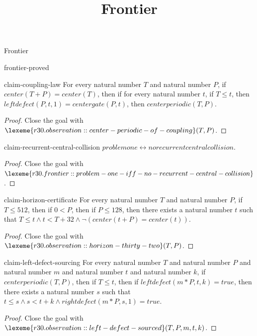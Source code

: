 \begin{lexlean}{Frontier}
\title{Frontier}

\begin{section}{frontier-proved}

\begin{theorem}{claim-coupling-law}
For every natural number \(T\) and natural number \(P\), if \(center(T + P) = center(T)\), then if for every natural number \(t\), if \(T ≤ t\), then \(leftdefect(P, t, 1) = centergate(P, t)\), then \(centerperiodic(T, P)\).
\begin{proof}
Close the goal with \(\lexeme{r30.observation::center-periodic-of-coupling}(T, P)\).
\end{proof}
\end{theorem}

\begin{theorem}{claim-recurrent-central-collision}
\(problemone ↔ norecurrentcentralcollision\).
\begin{proof}
Close the goal with \(\lexeme{r30.frontier::problem-one-iff-no-recurrent-central-collision}\).
\end{proof}
\end{theorem}

\begin{theorem}{claim-horizon-certificate}
For every natural number \(T\) and natural number \(P\), if \(T ≤ 512\), then if \(0 < P\), then if \(P ≤ 128\), then there exists a natural number \(t\) such that \(T ≤ t ∧ t < T + 32 ∧ ¬ (center(t + P) = center(t))\).
\begin{proof}
Close the goal with \(\lexeme{r30.observation::horizon-thirty-two}(T, P)\).
\end{proof}
\end{theorem}

\begin{theorem}{claim-left-defect-sourcing}
For every natural number \(T\) and natural number \(P\) and natural number \(m\) and natural number \(t\) and natural number \(k\), if \(centerperiodic(T, P)\), then if \(T ≤ t\), then if \(leftdefect(m * P, t, k) = true\), then there exists a natural number \(s\) such that \(t ≤ s ∧ s < t + k ∧ rightdefect(m * P, s, 1) = true\).
\begin{proof}
Close the goal with \(\lexeme{r30.observation::left-defect-sourced}(T, P, m, t, k)\).
\end{proof}
\end{theorem}


\end{section}
\end{lexlean}
